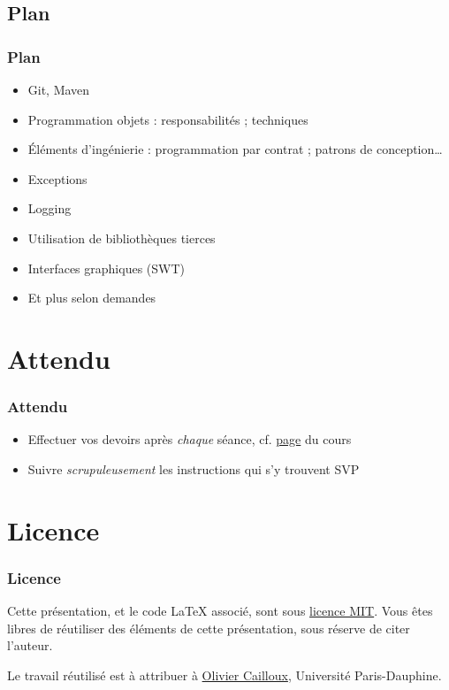 \documentclass[english, french]{beamer}
\begin{document}
\subsection{Plan}
\begin{frame}
	\frametitle{Plan}
	\begin{itemize}
		\item Git, Maven
		\item Programmation objets : responsabilités ; techniques
		\item Éléments d’ingénierie : programmation par contrat ; patrons de conception…
		\item Exceptions
		\item Logging
		\item Utilisation de bibliothèques tierces
		\item Interfaces graphiques (SWT)
		\item Et plus selon demandes
	\end{itemize}
\end{frame}

\section{Attendu}
\begin{frame}
	\frametitle{Attendu}
	\begin{itemize}
		\item Effectuer vos devoirs après \emph{chaque} séance, cf. \href{https://github.com/oliviercailloux/java-course/blob/master/Divers/L3a.adoc}{page} du cours
		\item Suivre \emph{scrupuleusement} les instructions qui s’y trouvent SVP
	\end{itemize}
\end{frame}

\appendix
\section{Licence}
\begin{frame}
	\frametitle{Licence}
	Cette présentation, et le code LaTeX associé, sont sous \href{http://opensource.org/licenses/MIT}{licence MIT}. Vous êtes libres de réutiliser des éléments de cette présentation, sous réserve de citer l’auteur.
	
	Le travail réutilisé est à attribuer à \href{http://www.lamsade.dauphine.fr/~ocailloux/}{Olivier Cailloux}, Université Paris-Dauphine.
\end{frame}
\end{document}

